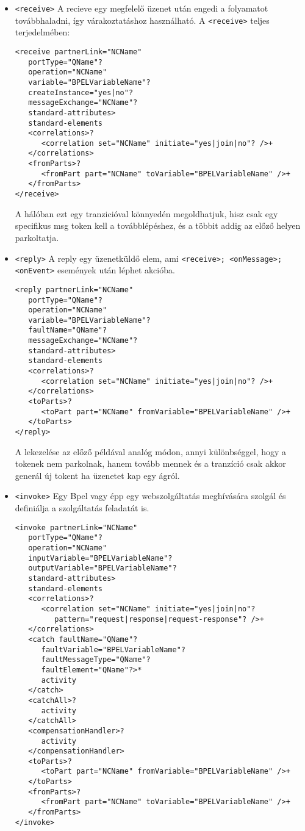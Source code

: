 \documentclass[12pt,a4paper]{book}
\begin{document}
\begin{itemize}

\item \texttt{<receive>} A recieve egy megfelelő üzenet után engedi a folyamatot továbbhaladni, így várakoztatáshoz használható. A \texttt{<receive>} teljes terjedelmében:\\
\begin{verbatim}
<receive partnerLink="NCName"
   portType="QName"?
   operation="NCName"
   variable="BPELVariableName"?
   createInstance="yes|no"?
   messageExchange="NCName"?
   standard-attributes>
   standard-elements
   <correlations>?
      <correlation set="NCName" initiate="yes|join|no"? />+
   </correlations>
   <fromParts>?
      <fromPart part="NCName" toVariable="BPELVariableName" />+
   </fromParts>
</receive>
\end{verbatim}
A hálóban ezt egy tranzicióval könnyedén megoldhatjuk, hisz csak egy specifikus msg token kell a továbblépéshez, és a többit addig az előző helyen parkoltatja. 
\item \texttt{<reply>} A reply egy üzenetküldő elem, ami \texttt{<receive>; <onMessage>;<onEvent>} események után léphet akcióba. 
\begin{verbatim}
<reply partnerLink="NCName"
   portType="QName"?
   operation="NCName"
   variable="BPELVariableName"?
   faultName="QName"?
   messageExchange="NCName"?
   standard-attributes>
   standard-elements
   <correlations>?
      <correlation set="NCName" initiate="yes|join|no"? />+
   </correlations>
   <toParts>?
      <toPart part="NCName" fromVariable="BPELVariableName" />+
   </toParts>
</reply>
\end{verbatim}
A lekezelése az előző példával analóg módon, annyi különbséggel, hogy a tokenek nem parkolnak, hanem tovább mennek és a tranzíció csak akkor generál új tokent ha üzenetet kap egy ágról.

\item \texttt{<invoke>} Egy Bpel vagy épp egy webszolgáltatás meghívására szolgál és definiálja a szolgáltatás feladatát is. 
\begin{verbatim}
<invoke partnerLink="NCName"
   portType="QName"?
   operation="NCName"
   inputVariable="BPELVariableName"?
   outputVariable="BPELVariableName"?
   standard-attributes>
   standard-elements
   <correlations>?
      <correlation set="NCName" initiate="yes|join|no"?
         pattern="request|response|request-response"? />+
   </correlations>
   <catch faultName="QName"?
      faultVariable="BPELVariableName"?
      faultMessageType="QName"?
      faultElement="QName"?>*
      activity
   </catch>
   <catchAll>?
      activity
   </catchAll>
   <compensationHandler>?
      activity
   </compensationHandler>
   <toParts>?
      <toPart part="NCName" fromVariable="BPELVariableName" />+
   </toParts>
   <fromParts>?
      <fromPart part="NCName" toVariable="BPELVariableName" />+
   </fromParts>
</invoke>
\end{verbatim}


\end{itemize}
\end{document}
